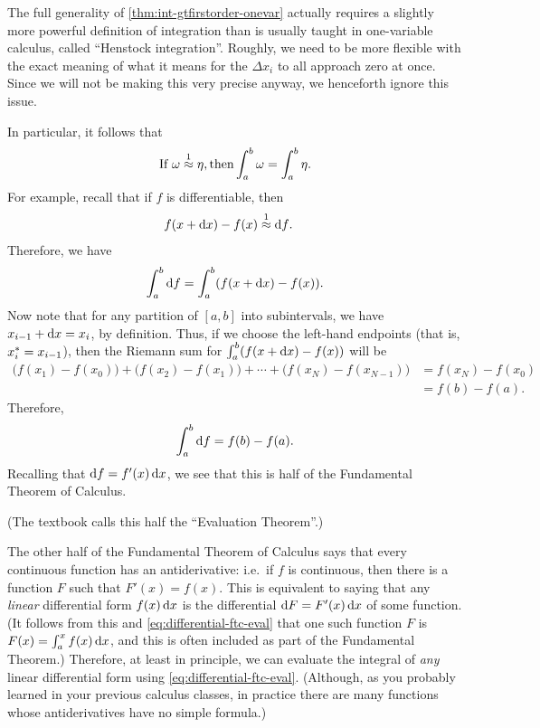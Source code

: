 \documentclass[12pt]{amsart}
\begin{document}
\begin{adv}
  The full generality of \cref{thm:int-gtfirstorder-onevar} actually requires a slightly more powerful definition of integration than is usually taught in one-variable calculus, called ``Henstock integration''.
  Roughly, we need to be more flexible with the exact meaning of what it means for the $\Delta x_i$ to all approach zero at once.
  Since we will not be making this very precise anyway, we henceforth ignore this issue.
\end{adv}

In particular, it follows that
\begin{equation}\label{eq:int-apx1-equal}
  \text{If }\omega\mathrel{\overset{1}{\approx}} \eta, \text{then} \displaystyle\int_a^b \omega = \int_a^b \eta.
\end{equation}
For example, recall that if $f$ is differentiable, then
\begin{align*}
  f(x+\dx)-f(x) &\apx1 \df. %
\end{align*}
Therefore, we have
\[ \int_a^b {\mathrm{d} f} = \int_a^b (f(x+{\mathrm{d} x}) - f(x)). \]
Now note that for any partition of $[a,b]$ into subintervals, we have $x_{i-1} + {\mathrm{d} x} = x_i$, by definition.
Thus, if we choose the left-hand endpoints (that is, ${x}_{i}^* = x_{i-1}$), then the Riemann sum for $\int_a^b (f(x+{\mathrm{d} x}) - f(x))$ will be
\begin{align*}
  \Big(f(x_1) - f(x_0)\Big) + \Big(f(x_2)-f(x_1)\Big) + \cdots + \Big(f(x_N) - f(x_{N-1})\Big)
  &= f(x_N) - f(x_0)\\
  &= f(b) - f(a).
\end{align*}
Therefore,
\begin{equation}
  \int_a^b {\mathrm{d} f} = f(b) - f(a).\label{eq:differential-ftc-eval}
\end{equation}
Recalling that ${\mathrm{d} f} = f'(x)\,{\mathrm{d} x}$, we see that this is half of the Fundamental Theorem of Calculus.
\begin{stewart}(The textbook calls this half the ``Evaluation Theorem''.)\end{stewart}

The other half of the Fundamental Theorem of Calculus says that every continuous function has an antiderivative: i.e.\ if $f$ is continuous, then there is a function $F$ such that $F'(x) = f(x)$.
This is equivalent to saying that any \emph{linear} differential form $f(x)\,{\mathrm{d} x}$ is the differential $\mathrm{d} F = F'(x)\,{\mathrm{d} x}$ of some function.
(It follows from this and \cref{eq:differential-ftc-eval} that one such function $F$ is $F(x)= \int_a^x f(x)\,{\mathrm{d} x}$, and this is often included as part of the Fundamental Theorem.)
Therefore, at least in principle, we can evaluate the integral of \emph{any} linear differential form using \cref{eq:differential-ftc-eval}.
(Although, as you probably learned in your previous calculus classes, in practice there are many functions whose antiderivatives have no simple formula.)
\end{document}
